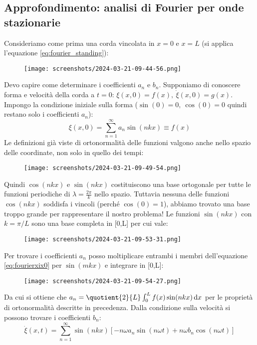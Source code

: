 \subsection{Approfondimento: analisi di Fourier per onde stazionarie}
Consideriamo come prima una corda vincolata in \(x=0\) e \(x=L\) (si applica l'equazione \eqref{eq:fourier_standing}):
\begin{figure}[H]
	\centering
	\texttt{[image: screenshots/2024-03-21-09-44-56.png]}
\end{figure}
Devo capire come determinare i coefficienti \(a_n\) e \(b_n\). Supponiamo di conoscere forma e velocità della corda a \(t=0\): \(\xi (x,0) = f(x),\ \dot{\xi }(x,0)=g(x)\). Impongo la condizione iniziale sulla forma (\(\sin (0)=0,\ \cos (0)=0\) quindi restano solo i coefficienti \(a_n\)):
\begin{equation}\label{eq:fourierxix0}
	\xi (x,0)= \sum_{n=1}^{\infty} a_n \sin (nkx) \equiv f(x)
\end{equation}
Le definizioni già viste di ortonormalità delle funzioni valgono anche nello spazio delle coordinate, non solo in quello dei tempi:
\begin{figure}[H]
	\centering
	\texttt{[image: screenshots/2024-03-21-09-49-54.png]}
\end{figure}
Quindi \(\cos (nkx)\) e \(\sin (nkx)\) costituiscono una base ortogonale per tutte le funzioni periodiche di \(\lambda = \frac{2\pi }{k}\) nello spazio. Tuttavia nessuna delle funzioni \(\cos (nkx)\) soddisfa i vincoli (perché \(\cos (0)=1\)), abbiamo trovato una base troppo grande per rappresentare il nostro problema! Le funzioni \(\sin (nkx)\) con \(k=\pi / L\) sono una base completa in [0,L] per cui vale:
\begin{figure}[H]
	\centering
	\texttt{[image: screenshots/2024-03-21-09-53-31.png]}
\end{figure}
Per trovare i coefficienti \(a_n\) posso moltiplicare entrambi i membri dell'equazione \eqref{eq:fourierxix0} per \(\sin (mkx)\) e integrare in [0,L]:
\begin{figure}[H]
	\centering
	\texttt{[image: screenshots/2024-03-21-09-54-27.png]}
\end{figure}
Da cui si ottiene che \(a_n = \quotient{2}{L} \int_{0}^{L} f(x) \sin (nkx) \,\mathrm{d}x\) per le proprietà di ortonormalità descritte in precedenza. Dalla condizione sulla velocità si possono trovare i coefficienti \(b_n\):
\[
	\dot{\xi }(x,t) = \sum_{n=1}^{\infty} \sin (nkx)[-n \omega a_n \sin (n \omega t) + n \omega b_n \cos (n \omega t)]
\]
